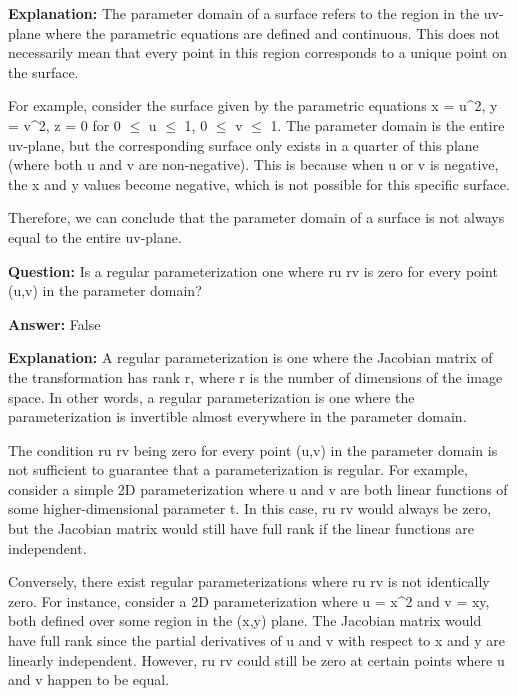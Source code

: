 \documentclass{article}
\begin{document}
                \textbf{Explanation:} The parameter domain of a surface refers to the region in the uv-plane where the parametric equations are defined and continuous. This does not necessarily mean that every point in this region corresponds to a unique point on the surface.

For example, consider the surface given by the parametric equations x = u{\textasciicircum}2, y = v{\textasciicircum}2, z = 0 for 0 \ensuremath{\leq} u \ensuremath{\leq} 1, 0 \ensuremath{\leq} v \ensuremath{\leq} 1. The parameter domain is the entire uv-plane, but the corresponding surface only exists in a quarter of this plane (where both u and v are non-negative). This is because when u or v is negative, the x and y values become negative, which is not possible for this specific surface.

Therefore, we can conclude that the parameter domain of a surface is not always equal to the entire uv-plane.
                
                \vspace{0.5cm} 
        
            
                \textbf {Question:} Is a regular parameterization one where ru {\texttimes} rv is zero for every point (u,v) in the parameter domain?
                
                \textbf{Answer:} False

                \textbf{Explanation:} A regular parameterization is one where the Jacobian matrix of the transformation has rank r, where r is the number of dimensions of the image space. In other words, a regular parameterization is one where the parameterization is invertible almost everywhere in the parameter domain.

The condition ru {\texttimes} rv being zero for every point (u,v) in the parameter domain is not sufficient to guarantee that a parameterization is regular. For example, consider a simple 2D parameterization where u and v are both linear functions of some higher-dimensional parameter t. In this case, ru {\texttimes} rv would always be zero, but the Jacobian matrix would still have full rank if the linear functions are independent.

Conversely, there exist regular parameterizations where ru {\texttimes} rv is not identically zero. For instance, consider a 2D parameterization where u = x{\textasciicircum}2 and v = xy, both defined over some region in the (x,y) plane. The Jacobian matrix would have full rank since the partial derivatives of u and v with respect to x and y are linearly independent. However, ru {\texttimes} rv could still be zero at certain points where u and v happen to be equal.
\end{document}
